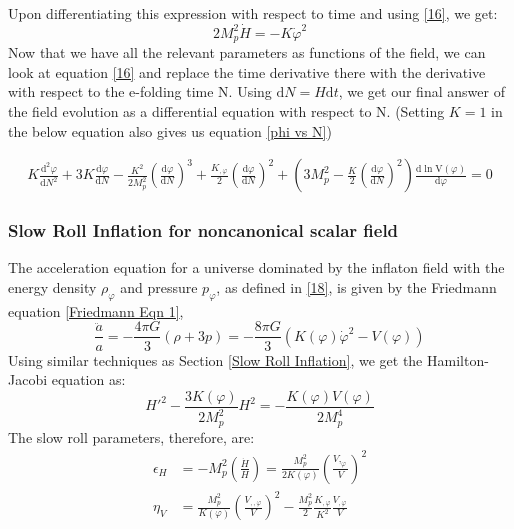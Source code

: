 \documentclass[aps,prd,reprint,preprintnumbers,showpacs,floatfix,nofootinbib,superscript address]{revtex4-2}
\begin{document}
Upon differentiating this expression with respect to time and using \cref{16}, we get:
\begin{equation} \label{20}
    2 M_p^2 \dot{H} = -  K \dot{\varphi}^2
\end{equation}
Now that we have all the relevant parameters as functions of the field, we can look at equation \cref{16} and replace the time derivative there with the derivative with respect to the e-folding time N. Using $\text{d}N = H \text{d}t$, we get our final answer of the field evolution as a differential equation with respect to N. (Setting $K = 1$ in the below equation also gives us equation \cref{phi vs N})
\begin{widetext}
\begin{subequations}
\begin{align}\label{Kphi vs N}
    K\frac{\text{d}^2\varphi}{\text{d}N^2} +3 K \frac{\text{d}\varphi}{\text{d}N}  - \frac{K^2}{2M_p^2} \left(\frac{\text{d}\varphi}{\text{d}N} \right)^3  +  \frac{K_{,\varphi}}{2}  \left(\frac{\text{d}\varphi}{\text{d}N} \right)^2 +  \left( 3 M_p^2 - \frac{K}{2} \left(\frac{\text{d}\varphi}{\text{d}N} \right)^2 \right) \frac{\text{d}\ln \text{V}(\varphi)}{\text{d} \varphi} = 0    
\end{align}
\end{subequations}
\end{widetext}
\subsubsection{Slow Roll Inflation for noncanonical scalar field}
The acceleration equation for a universe dominated by the inflaton field with the energy density $\rho_{\varphi}$ and pressure $p_{\varphi}$, as defined in \cref{18}, is given by the Friedmann equation \cref{Friedmann Eqn 1},
\begin{equation}
    \frac{\ddot{a}}{a} = -\frac{4\pi G}{3} (\rho +3p) = -\frac{8\pi G}{3} (K(\varphi){\dot{\varphi}}^2 - V(\varphi)) 
\end{equation}
Using similar techniques as Section \cref{Slow Roll Inflation}, we get the Hamilton-Jacobi equation as: 
\begin{equation}    \label{KHJ}
    H'^2 - \frac{3K(\varphi)}{2M_p^2}H^2 = - \frac{K(\varphi) V(\varphi)}{2M_p^4} 
\end{equation}
The slow roll parameters, therefore, are:
\begin{align}
    \epsilon_H &= - M_p^2 \left(\frac{\dot{H}}{H} \right) = \frac{M_p^2}{2 K(\varphi)} \left(\frac{V,_\varphi}{V}\right)^2 \\
    \eta_V &= \frac{M_p^2}{K(\varphi)} \left( \frac{V_{,,\varphi}}{V} \right)^2 - \frac{M_p^2}{2} \frac{K_{,\varphi}}{K^2} \frac{V_{,\varphi}}{V}
\end{align}
\end{document}
